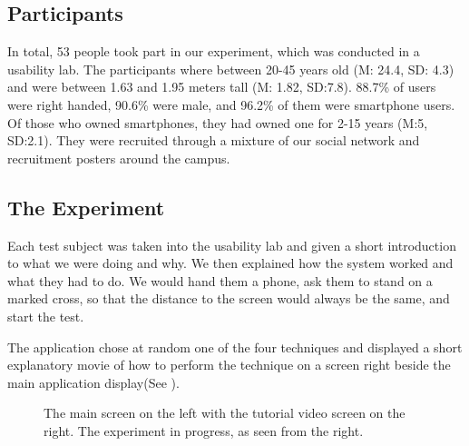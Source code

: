 \subsection{Participants}
In total, 53 people took part in our experiment, which was conducted in a usability lab. 
The participants where between 20-45 years old (M: 24.4, SD: 4.3) and were between 1.63 and 1.95 meters tall (M: 1.82, SD:7.8). 
88.7\% of users were right handed, 90.6\% were male, and 96.2\% of them were smartphone users. 
Of those who owned smartphones, they had owned one for 2-15 years (M:5, SD:2.1). 
They were recruited through a mixture of our social network and recruitment posters around the campus. 

\subsection{The Experiment}

Each test subject was taken into the usability lab and given a short introduction to what we were doing and why. 
We then explained how the system worked and what they had to do. 
We would hand them a phone, ask them to stand on a marked cross, so that the distance to the screen would always be the same, and start the test.

The application chose at random one of the four techniques and displayed a short explanatory movie of how to perform the technique on a screen right beside the main application display(See ).

\begin{figure}[H]
	\centering
	\hspace{0.01\columnwidth}
	\caption{
		\protect{} The main screen on the left with the tutorial video screen on the right.
		\protect{} The experiment in progress, as seen from the right. 
	}
	\label{fig:setup}
\end{figure} 

